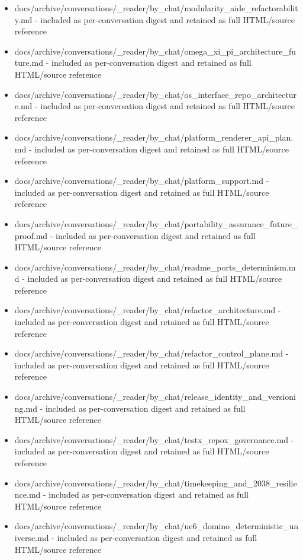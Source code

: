 \documentclass[11pt,a4paper]{report}
\begin{document}
\begin{itemize}
\item docs/archive/conversations/\_reader/by\_chat/modularity\_aide\_refactorability.md - included as per-conversation digest and retained as full HTML/source reference
\item docs/archive/conversations/\_reader/by\_chat/omega\_xi\_pi\_architecture\_future.md - included as per-conversation digest and retained as full HTML/source reference
\item docs/archive/conversations/\_reader/by\_chat/os\_interface\_repo\_architecture.md - included as per-conversation digest and retained as full HTML/source reference
\item docs/archive/conversations/\_reader/by\_chat/platform\_renderer\_api\_plan.md - included as per-conversation digest and retained as full HTML/source reference
\item docs/archive/conversations/\_reader/by\_chat/platform\_support.md - included as per-conversation digest and retained as full HTML/source reference
\item docs/archive/conversations/\_reader/by\_chat/portability\_assurance\_future\_proof.md - included as per-conversation digest and retained as full HTML/source reference
\item docs/archive/conversations/\_reader/by\_chat/readme\_ports\_determinism.md - included as per-conversation digest and retained as full HTML/source reference
\item docs/archive/conversations/\_reader/by\_chat/refactor\_architecture.md - included as per-conversation digest and retained as full HTML/source reference
\item docs/archive/conversations/\_reader/by\_chat/refactor\_control\_plane.md - included as per-conversation digest and retained as full HTML/source reference
\item docs/archive/conversations/\_reader/by\_chat/release\_identity\_and\_versioning.md - included as per-conversation digest and retained as full HTML/source reference
\item docs/archive/conversations/\_reader/by\_chat/testx\_repox\_governance.md - included as per-conversation digest and retained as full HTML/source reference
\item docs/archive/conversations/\_reader/by\_chat/timekeeping\_and\_2038\_resilience.md - included as per-conversation digest and retained as full HTML/source reference
\item docs/archive/conversations/\_reader/by\_chat/ue6\_domino\_deterministic\_universe.md - included as per-conversation digest and retained as full HTML/source reference

\end{itemize}
\end{document}
